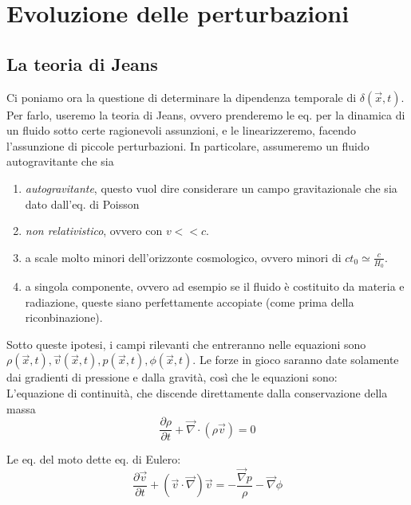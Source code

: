 \documentclass{report}
\begin{document}
\newpage

\chapter{Evoluzione delle perturbazioni}

\section{La teoria di Jeans}

Ci poniamo ora la questione di determinare la dipendenza temporale di $\delta(\vec{x}, t)$. Per farlo, useremo la teoria di Jeans, ovvero prenderemo le eq. per la dinamica di un fluido sotto certe ragionevoli assunzioni, e le linearizzeremo, facendo l'assunzione di piccole perturbazioni. In particolare, assumeremo un fluido autogravitante che sia 
\begin{enumerate}
    \item \emph{autogravitante}, questo vuol dire considerare un campo gravitazionale che sia dato dall'eq. di Poisson
    \item \emph{non relativistico}, ovvero con $v << c$. 
    \item a scale molto minori dell'orizzonte cosmologico, ovvero minori di $ct_0 \simeq \frac{c}{H_0}$. 
    \item a singola componente, ovvero ad esempio se il fluido è costituito da materia e radiazione, queste siano perfettamente accopiate (come prima della riconbinazione). 
\end{enumerate}

Sotto queste ipotesi, i campi rilevanti che entreranno nelle equazioni sono $\rho(\vec{x}, t), \vec{v}(\vec{x}, t), p(\vec{x}, t), \phi(\vec{x}, t)$. Le forze in gioco saranno date solamente dai gradienti di pressione e dalla gravità, così che le equazioni sono: \\

L'equazione di continuità, che discende direttamente dalla conservazione della massa
\begin{equation}
    \frac{\partial \rho}{\partial t} + \vec{\nabla} \cdot (\rho\vec{v}) = 0
\end{equation}

Le eq. del moto dette eq. di Eulero:
\begin{equation}
    \frac{\partial \vec{v}}{\partial t} + (\vec{v}\cdot\vec{\nabla})\vec{v} = -\frac{\vec{\nabla} p}{\rho} - \vec{\nabla}\phi
\end{equation}
\end{document}
